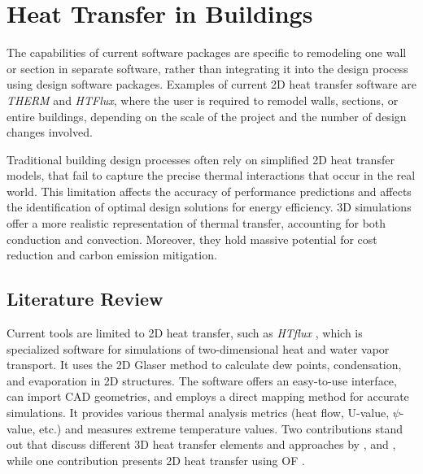 \chapter{Heat Transfer in Buildings}



The capabilities of current software packages are specific to remodeling one wall or section in separate software, rather than integrating it into the design process using design software packages. Examples of current 2D heat transfer software are \textit{THERM} and \textit{HTFlux}, where
the user is required to remodel walls, sections, or entire buildings, depending on the scale of the project and the number of design changes involved.

Traditional building design processes often rely on simplified 2D heat transfer models, that fail to capture the precise thermal interactions that occur in the real world. This limitation affects the accuracy of performance predictions and affects the identification of optimal design solutions for energy efficiency. 
3D simulations offer a more realistic representation of thermal transfer, accounting for both conduction and convection. 
Moreover, they hold massive potential for cost reduction and carbon emission mitigation. 






\section{Literature Review}






Current tools are limited to 2D heat transfer, such as \textit{HTflux} \cite{HTflux}, which is specialized software for simulations of two-dimensional heat and water vapor transport.
It uses the 2D Glaser method \cite{glaser1959graphisches} to calculate dew points, condensation, and evaporation in 2D structures. 
The software offers an easy-to-use interface, can import \gls{CAD} geometries, and employs a direct mapping method for accurate simulations. 
It provides various thermal analysis metrics (heat flow, U-value, $\psi$-value, etc.) and measures extreme temperature values. Two contributions stand out that discuss different 3D heat transfer elements and approaches by  \citeauthor{Yang} \cite{Yang}, and \citeauthor{COMSOL} \cite{COMSOL}, while one contribution presents 2D heat transfer using \gls{OF} \cite{kastner2020solving}.

